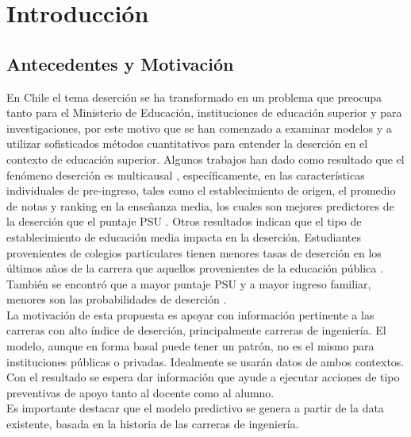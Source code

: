 \chapter[Introducción]{Introducción}
\label{ch:intro}



\section{Antecedentes y Motivación}
\label{sec:motivacion}

En Chile el tema deserción se ha transformado en un problema que preocupa tanto para el Ministerio de Educación, instituciones de educación superior y para investigaciones, por este motivo que se han comenzado a examinar modelos y a utilizar sofisticados métodos cuantitativos para entender la deserción en el contexto de educación superior. Algunos trabajos han dado como resultado que el fenómeno deserción es multicausal \cite{acuna}, específicamente, en las características individuales de pre-ingreso, tales como el establecimiento de origen, el promedio de notas y ranking en la enseñanza media, los cuales son mejores predictores de la deserción que el puntaje PSU  \cite{larroucau}. Otros resultados indican que el tipo de establecimiento de educación media impacta en la deserción. Estudiantes provenientes de colegios particulares tienen menores tasas de deserción en los últimos años de la carrera que aquellos provenientes de la educación pública \cite{celis}. También se encontró que a mayor puntaje PSU y a mayor ingreso familiar, menores son las probabilidades de deserción \cite{diaz}. \\

La motivación de esta propuesta es apoyar con información pertinente a las carreras con alto índice de deserción, principalmente carreras de ingeniería. El modelo, aunque en forma basal puede tener un patrón, no es el mismo para instituciones públicas o privadas. Idealmente se usarán datos de ambos contextos. Con el resultado se espera dar información que ayude a ejecutar acciones de tipo preventivas de apoyo tanto al docente como al alumno.\\ 

Es importante destacar que el modelo predictivo se genera a partir de la data existente, basada en la historia de las carreras de ingeniería.\\







